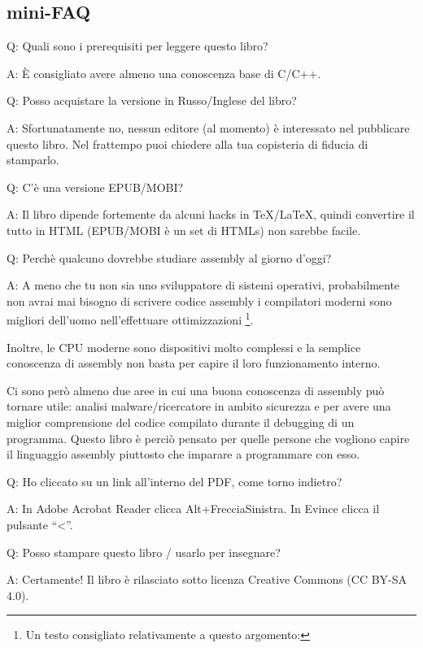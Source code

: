 \subsection*{mini-FAQ}

\par Q: Quali sono i prerequisiti per leggere questo libro?
\par A: È consigliato avere almeno una conoscenza base di C/C++.

\par Q: Posso acquistare la versione in Russo/Inglese del libro?
\par A: Sfortunatamente no, nessun editore (al momento) è interessato nel pubblicare questo libro.
Nel frattempo puoi chiedere alla tua copisteria di fiducia di stamparlo.

\par Q: C'è una versione EPUB/MOBI?
\par A: Il libro dipende fortemente da alcuni hacks in TeX/LaTeX, quindi convertire il tutto in HTML (EPUB/MOBI è un set di HTMLs)
non sarebbe facile.

\par Q: Perchè qualcuno dovrebbe studiare assembly al giorno d'oggi?
\par A: A meno che tu non sia uno sviluppatore di \ac{sistemi operativi}, probabilmente non avrai mai bisogno di scrivere codice assembly \textemdash{}i compilatori moderni sono migliori dell'uomo nell'effettuare ottimizzazioni \footnote{Un testo consigliato relativamente a questo argomento: \InSqBrackets{\AgnerFog}}.

Inoltre, le \ac{CPU} moderne sono dispositivi molto complessi e la semplice conoscenza di assembly non basta per capire il loro funzionamento interno.

Ci sono però almeno due aree in cui una buona conoscenza di assembly può tornare utile: analisi malware/ricercatore in ambito sicurezza e per avere una miglior comprensione del codice compilato durante il debugging di un programma. 
Questo libro è perciò pensato per quelle persone che vogliono capire il linguaggio assembly piuttosto che imparare a programmare con esso.

\par Q: Ho cliccato su un link all'interno del PDF, come torno indietro?
\par A: In Adobe Acrobat Reader clicca Alt+FrecciaSinistra. In Evince clicca il pulsante ``<''.

\par Q: Posso stampare questo libro / usarlo per insegnare?
\par A: Certamente! Il libro è rilasciato sotto licenza Creative Commons (CC BY-SA 4.0).

